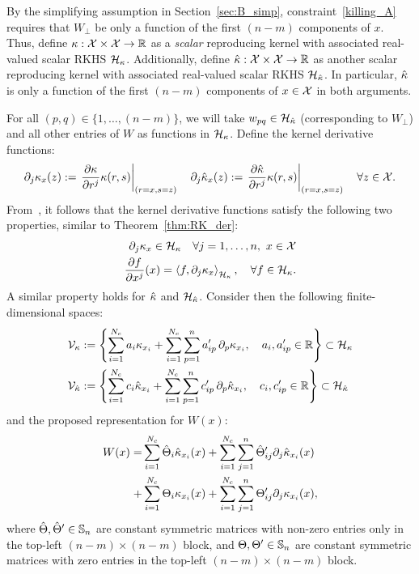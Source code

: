 By the simplifying assumption in Section~\ref{sec:B_simp}, constraint~\eqref{killing_A} requires that $W_{\perp}$ be only a function of the first $(n-m)$ components of $x$. Thus, define $\kappa : \mathcal{X} \times \mathcal{X} \rightarrow \mathbb{R}$ as a \emph{scalar} reproducing kernel with associated real-valued scalar RKHS $\mathcal{H}_{\kappa}$. Additionally, define $\hat{\kappa} : \mathcal{X} \times \mathcal{X} \rightarrow \mathbb{R}$ as another scalar reproducing kernel with associated real-valued scalar RKHS $\mathcal{H}_{\hat{\kappa}}$. In particular, $\hat{\kappa}$ is only a function of the first $(n-m)$ components of $x \in \mathcal{X}$ in both arguments.  

For all $(p,q) \in \{1,\ldots,(n-m)\}$, we will take $w_{pq} \in \mathcal{H}_{\hat{\kappa}}$ (corresponding to $W_{\perp}$) and all other entries of $W$ as functions in $\mathcal{H}_{\kappa}$. Define the kernel derivative functions:
\[
    \partial_j \kappa_{x}(z) := \left.\dfrac{\partial \kappa}{\partial r^j} \kappa(r,s)\right|_{(r=x,s=z)} \quad \partial_j \hat{\kappa}_{x}(z) := \left.\dfrac{\partial \hat{\kappa}}{\partial r^j} \kappa(r,s)\right|_{(r=x,s=z)} \quad \forall z \in \mathcal{X}.
\]
From~\cite{Zhou2008}, it follows that the kernel derivative functions satisfy the following two properties, similar to Theorem~\ref{thm:RK_der}:
\[
    \begin{split}
            \partial_j \kappa_{x} \in \mathcal{H}_{\kappa} \quad \forall j = 1,\ldots,n,\  x \in \mathcal{X} \\
            \dfrac{\partial f}{\partial x^j}(x) = \left\langle f, \partial_j \kappa_x \right\rangle_{\mathcal{H}_{\kappa}}, \quad \forall f \in \mathcal{H}_{\kappa}.
    \end{split}
\]
A similar property holds for $\hat{\kappa}$ and $\mathcal{H}_{\hat{\kappa}}$. Consider then the following finite-dimensional spaces:
\begin{align}
	\mathcal{V}_{\kappa} &:= \left\{ \sum_{i=1}^{N_c}  a_i \kappa_{x_i} + \sum_{i=1}^{N_c} \sum_{p=1}^{n}  a_{ip}' \,  \partial_p \kappa_{x_i} ,\quad a_i, a_{ip}' \in \mathbb{R} \right\} \subset \mathcal{H}_{\kappa} \\
	\mathcal{V}_{\hat{\kappa}} & := \left\{ \sum_{i=1}^{N_c} c_i \hat{\kappa}_{x_i} + \sum_{i=1}^{N_c} \sum_{p=1}^{n}  c_{ip}' \,  \partial_p \hat{\kappa}_{x_i} ,\quad c_i, c_{ip}' \in \mathbb{R} \right\} \subset \mathcal{H}_{\hat{\kappa}} 
\end{align}
and the proposed representation for $W(x)$:
\begin{equation}
	\begin{split}
	W(x) =  &\sum_{i=1}^{N_c} \hat{\Theta}_i \hat{\kappa}_{x_i} (x) + \sum_{i=1}^{N_c}\sum_{j=1}^{n} \hat{\Theta}'_{ij} \partial_{j}\hat{\kappa}_{x_i} (x)  \\
		+  & \sum_{i=1}^{N_c} \Theta_i \kappa_{x_i} (x) + \sum_{i=1}^{N_c}\sum_{j=1}^{n} \Theta'_{ij} \partial_{j}\kappa_{x_i} (x),
	\end{split}
\label{W_rep}
\end{equation}
where $\hat{\Theta}, \hat{\Theta}' \in \mathbb{S}_{n}$ are constant symmetric matrices with non-zero entries only in the top-left $(n-m)\times(n-m)$ block, and $\Theta,\Theta' \in \mathbb{S}_{n}$ are constant symmetric matrices with zero entries in the top-left $(n-m)\times(n-m)$ block.

